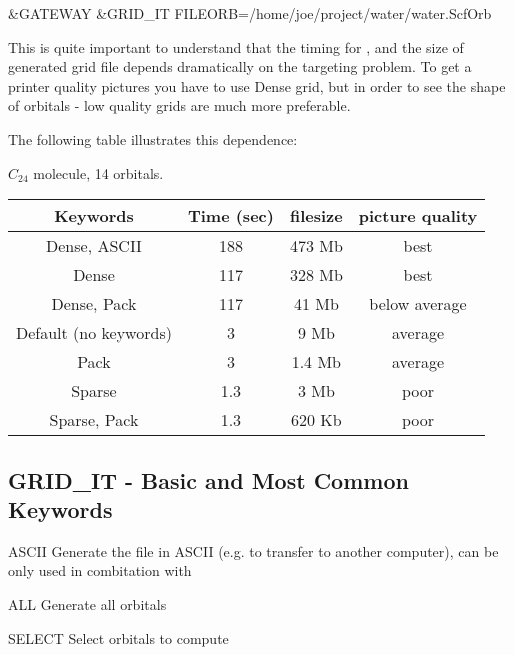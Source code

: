 \begin{inputlisting}
&GATEWAY
&GRID_IT
FILEORB=/home/joe/project/water/water.ScfOrb
\end{inputlisting}

\ifmanual

This is quite important to understand that the timing for , and
the size of generated grid file depends dramatically on the targeting problem.
To get a printer quality pictures you have to use Dense grid, but in order to see the
shape of orbitals - low quality grids are much more preferable.

The following table illustrates this dependence:

$C_{24}$ molecule, 14 orbitals.

\begin{tabular}{|c|c|c|c|} \hline
Keywords & Time (sec) & filesize & picture quality \\
\hline
Dense, ASCII  & 188  & 473 Mb & best \\
Dense         & 117   & 328 Mb & best \\
Dense, Pack   & 117  & 41  Mb & below average \\
Default (no keywords)  & 3 & 9 Mb & average \\
Pack                   & 3 & 1.4 Mb & average \\
Sparse                 & 1.3 & 3 Mb & poor \\
Sparse, Pack           & 1.3 & 620 Kb & poor \\
\hline
\end{tabular}

\fi
\subsection{GRID\_IT - Basic and Most Common Keywords}
\begin{keywordlist}
\item[ASCII] Generate the  file in ASCII (e.g. to transfer to another computer), 
can be only used in combitation with 
\item[ALL]   Generate all orbitals
\item[SELECT] Select orbitals to compute
\item[]

\end{keywordlist}

